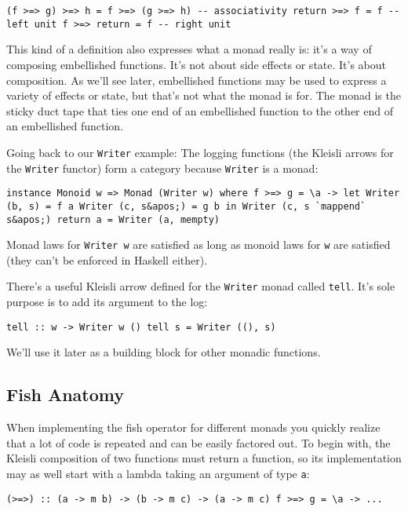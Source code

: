 \begin{verbatim}
(f >=> g) >=> h = f >=> (g >=> h) -- associativity return >=> f = f -- left unit f >=> return = f -- right unit
\end{verbatim}

This kind of a definition also expresses what a monad really is: it's a
way of composing embellished functions. It's not about side effects or
state. It's about composition. As we'll see later, embellished functions
may be used to express a variety of effects or state, but that's not
what the monad is for. The monad is the sticky duct tape that ties one
end of an embellished function to the other end of an embellished
function.

Going back to our \texttt{Writer} example: The logging functions (the
Kleisli arrows for the \texttt{Writer} functor) form a category because
\texttt{Writer} is a monad:

\begin{verbatim}
instance Monoid w => Monad (Writer w) where f >=> g = \a -> let Writer (b, s) = f a Writer (c, s&apos;) = g b in Writer (c, s `mappend` s&apos;) return a = Writer (a, mempty)
\end{verbatim}

Monad laws for \texttt{Writer\ w} are satisfied as long as monoid laws
for \texttt{w} are satisfied (they can't be enforced in Haskell either).

There's a useful Kleisli arrow defined for the \texttt{Writer} monad
called \texttt{tell}. It's sole purpose is to add its argument to the
log:

\begin{verbatim}
tell :: w -> Writer w () tell s = Writer ((), s)
\end{verbatim}

We'll use it later as a building block for other monadic functions.

\subsection{Fish Anatomy}\label{fish-anatomy}

When implementing the fish operator for different monads you quickly
realize that a lot of code is repeated and can be easily factored out.
To begin with, the Kleisli composition of two functions must return a
function, so its implementation may as well start with a lambda taking
an argument of type \texttt{a}:

\begin{verbatim}
(>=>) :: (a -> m b) -> (b -> m c) -> (a -> m c) f >=> g = \a -> ...
\end{verbatim}

